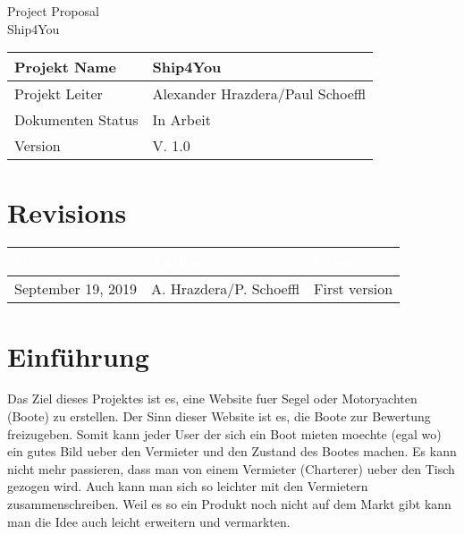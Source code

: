 \documentclass[12pt]{article}
\theoremstyle{definition}
\newcommand{\projectname}{Ship4You}
\newcommand{\productname}{Ship4You}
\newcommand{\projectleader}{Alexander Hrazdera/Paul Schoeffl}
\newcommand{\documentstatus}{In Arbeit}
\newcommand{\version}{V. 1.0}
\begin{document}
\begin{titlepage}

\vspace{10em}

\begin{center}
{\Huge Project Proposal} \\[3em]
{\LARGE \productname} \\[3em]
\end{center}

\begin{flushleft} 
\begin{tabular}{|l|l|}
\hline
Projekt Name & \projectname \\ \hline
Projekt Leiter & \projectleader \\ \hline
Dokumenten Status & \documentstatus \\ \hline
Version & \version \\ \hline
\end{tabular}
\end{flushleft}

\end{titlepage}
\section*{Revisions}
\begin{tabular}{|l|l|l|}
\hline
\cellcolor[gray]{0.5}\textcolor{white}{Date} & \cellcolor[gray]{0.5}\textcolor{white}{Author} & \cellcolor[gray]{0.5}\textcolor{white}{Change} \\ \hline
September 19, 2019&A. Hrazdera/P. Schoeffl&First version \\ \hline
\end{tabular}

\pagebreak

\tableofcontents

\pagebreak

\section{Einführung}
Das Ziel dieses Projektes ist es, eine Website fuer Segel oder Motoryachten (Boote) zu erstellen. Der Sinn dieser Website ist es, die Boote zur Bewertung freizugeben. Somit kann jeder User der sich ein Boot mieten moechte (egal wo) ein gutes Bild ueber den Vermieter und den Zustand des Bootes machen. Es kann nicht mehr passieren, dass man von einem Vermieter (Charterer) ueber den Tisch gezogen wird. Auch kann man sich so leichter mit den Vermietern zusammenschreiben. Weil es so ein Produkt noch nicht auf dem Markt gibt kann man die Idee auch leicht erweitern und vermarkten. 
\end{document}
